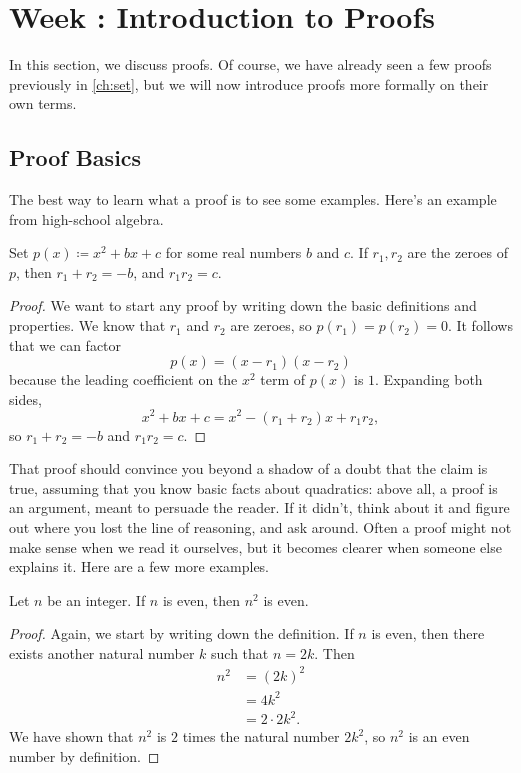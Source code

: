 \documentclass[../notes.tex]{subfiles}
\begin{document}
\section{Week \theweek: Introduction to Proofs}
In this section, we discuss proofs. Of course, we have already seen a few proofs previously in \cref{ch:set}, but we will now introduce proofs more formally on their own terms.

\subsection{Proof Basics}
The best way to learn what a proof is to see some examples. Here's an example from high-school algebra.
\begin{example}
    Set $p(x) \coloneqq x^2 + bx + c$ for some real numbers $b$ and $c$. If $r_1,r_2$ are the zeroes of $p$, then $r_1 + r_2 = -b$, and $r_1r_2 = c$.
\end{example}
\begin{proof}
    We want to start any proof by writing down the basic definitions and properties. We know that $r_1$ and $r_2$ are zeroes, so $p(r_1) = p(r_2) = 0$. It follows that we can factor
    \[p(x)=(x-r_1)(x-r_2)\]
    because the leading coefficient on the $x^2$ term of $p(x)$ is $1$. Expanding both sides,
    \[x^2 + bx + c = x^2 - (r_1 + r_2)x + r_1r_2,\]
    so $r_1 + r_2 = -b$ and $r_1r_2 = c$.
\end{proof}
That proof should convince you beyond a shadow of a doubt that the claim is true, assuming that you know basic facts about quadratics: above all, a proof is an argument, meant to persuade the reader. If it didn't, think about it and figure out where you lost the line of reasoning, and ask around. Often a proof might not make sense when we read it ourselves, but it becomes clearer when someone else explains it. Here are a few more examples.
\begin{example} \label{exe:squares-even}
    Let $n$ be an integer. If $n$ is even, then $n^2$ is even.
\end{example}
\begin{proof}
    Again, we start by writing down the definition. If $n$ is even, then there exists another natural number $k$ such that $n = 2k$. Then
    \begin{align*}
        n^2 &= (2k)^2\\
        &= 4k^2\\
        &= 2 \cdot 2k^2.
    \end{align*}
    We have shown that $n^2$ is $2$ times the natural number $2k^2$, so $n^2$ is an even number by definition.
\end{proof}
\end{document}
